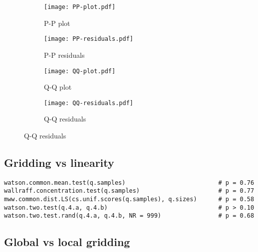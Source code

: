 \documentclass[../../ArchStats.tex]{subfiles}
\begin{document}
\begin{figure}[h!]
\label{fig:Genlis-prob-plots}
\centering
\caption{Probability plots of the fitted candidate distributions and their residuals.}
%
\begin{subfigure}[t]{0.24\textwidth}
\caption{P-P plot}
\texttt{[image: PP-plot.pdf]}
\end{subfigure}
%
\begin{subfigure}[t]{0.24\textwidth}
\caption{P-P residuals}
\texttt{[image: PP-residuals.pdf]}
\end{subfigure}
%
\begin{subfigure}[t]{0.24\textwidth}
\caption{Q-Q plot}
\texttt{[image: QQ-plot.pdf]}
\end{subfigure}
%
\begin{subfigure}[t]{0.24\textwidth}
\caption{Q-Q residuals}
\texttt{[image: QQ-residuals.pdf]}
\end{subfigure}
%
\end{figure}

\subsection{Gridding vs linearity}

\begin{verbatim}
watson.common.mean.test(q.samples)                          # p = 0.76
wallraff.concentration.test(q.samples)                      # p = 0.77
mww.common.dist.LS(cs.unif.scores(q.samples), q.sizes)      # p = 0.58
watson.two.test(q.4.a, q.4.b)                               # p > 0.10
watson.two.test.rand(q.4.a, q.4.b, NR = 999)                # p = 0.68
\end{verbatim}


\subsection{Global vs local gridding}

\end{document}
